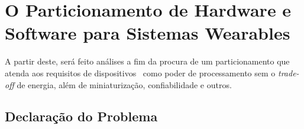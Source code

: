    \section{O Particionamento de Hardware e Software para Sistemas Wearables} \label{sec:desenvolvimento}

      A partir deste, será feito análises a fim da procura de um particionamento que atenda aos requisitos de dispositivos \wearables\ como poder de processamento sem o \textit{trade-off} de energia, além de miniaturização, confiabilidade e outros.



   \subsection{Declaração do Problema} \label{sec:declaracao_problema}

